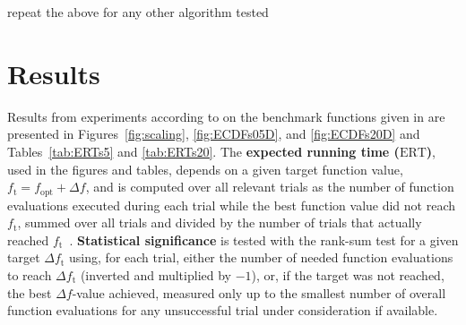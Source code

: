 \documentclass[conference]{IEEEtran}
\newcommand{\ERT}{\ensuremath{\mathrm{ERT}}}
\newcommand{\Df}{\ensuremath{\Delta f}}
\newcommand{\fopt}{\ensuremath{f_\mathrm{opt}}}
\newcommand{\ftarget}{\ensuremath{f_\mathrm{t}}}
\newcommand{\change}[1]{{\color{red} #1}}
\begin{document}
\change{repeat the above for any other algorithm tested}


\section{Results}


Results from experiments according to \cite{hansen2012exp} on the benchmark functions given in \cite{wp200902_2010,hansen2012noi} are presented in 
Figures~\ref{fig:scaling}, \ref{fig:ECDFs05D}, and \ref{fig:ECDFs20D} and
Tables~\ref{tab:ERTs5} and \ref{tab:ERTs20}.
The \textbf{expected running time (\ERT)}, used in the figures and tables,
depends on a given target function value, $\ftarget=\fopt+\Df$, and is computed
over all relevant trials as the number of function evaluations executed during
each trial while the best function value did not reach \ftarget, summed over
all trials and divided by the number of trials that actually reached \ftarget\
\cite{hansen2012exp,price1997dev}.
\textbf{Statistical significance} is tested with the rank-sum test for a given
target $\Delta\ftarget$ using, for each trial, either the number of needed
function evaluations to reach $\Delta\ftarget$ (inverted and multiplied by
$-1$), or, if the target was not reached, the best $\Df$-value achieved,
measured only up to the smallest number of overall function evaluations for any
unsuccessful trial under consideration if available.



\end{document}
